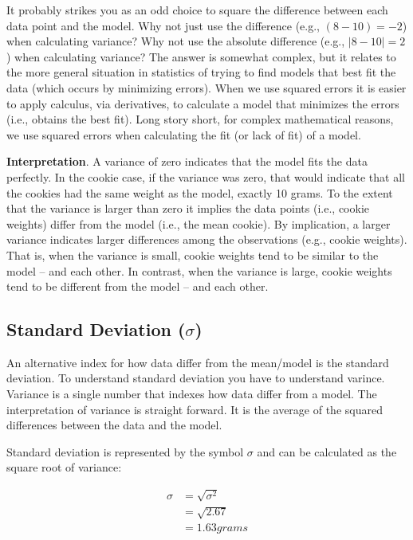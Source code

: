 \documentclass[
]{krantz}
\begin{document}
It probably strikes you as an odd choice to square the difference between each data point and the model. Why not just use the difference (e.g., \((8 - 10) = -2\)) when calculating variance? Why not use the absolute difference (e.g., \(|8 - 10|= 2\)) when calculating variance? The answer is somewhat complex, but it relates to the more general situation in statistics of trying to find models that best fit the data (which occurs by minimizing errors). When we use squared errors it is easier to apply calculus, via derivatives, to calculate a model that minimizes the errors (i.e., obtains the best fit). Long story short, for complex mathematical reasons, we use squared errors when calculating the fit (or lack of fit) of a model.

\textbf{Interpretation}. A variance of zero indicates that the model fits the data perfectly. In the cookie case, if the variance was zero, that would indicate that all the cookies had the same weight as the model, exactly 10 grams. To the extent that the variance is larger than zero it implies the data points (i.e., cookie weights) differ from the model (i.e., the mean cookie). By implication, a larger variance indicates larger differences among the observations (e.g., cookie weights). That is, when the variance is small, cookie weights tend to be similar to the model -- and each other. In contrast, when the variance is large, cookie weights tend to be different from the model -- and each other.

\hypertarget{standard-deviation-sigma}{%
\subsection{\texorpdfstring{Standard Deviation (\(\sigma\))}{Standard Deviation (\textbackslash sigma)}}\label{standard-deviation-sigma}}

An alternative index for how data differ from the mean/model is the standard deviation. To understand standard deviation you have to understand varince. Variance is a single number that indexes how data differ from a model. The interpretation of variance is straight forward. It is the average of the squared differences between the data and the model.

Standard deviation is represented by the symbol \(\sigma\) and can be calculated as the square root of variance:

\[
\begin{aligned} 
\sigma &= \sqrt{\sigma^2} \\
&= \sqrt{2.67} \\
&= 1.63 grams\\
\end{aligned} 
\]
\end{document}
